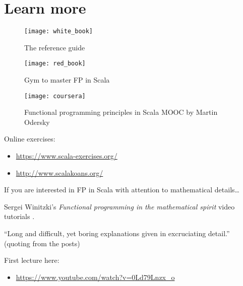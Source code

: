 \documentclass[10pt]{beamer}
\begin{document}
\section{Learn more}

\begin{frame}
\begin{figure}
\centering
\texttt{[image: white\_book]}
\caption{The reference guide}
\end{figure}
\end{frame}

\begin{frame}
\begin{figure}
\centering
\texttt{[image: red\_book]}
\caption{Gym to master FP in Scala}
\end{figure}
\end{frame}

\begin{frame}
\begin{figure}
\centering
\texttt{[image: coursera]}
\caption{Functional programming principles in Scala MOOC by Martin Odersky}
\end{figure}
\end{frame}

\begin{frame}
Online exercises:
\begin{itemize}
\item \url{https://www.scala-exercises.org/}
\item \url{http://www.scalakoans.org/}
\end{itemize}
\end{frame}

\begin{frame}[fragile]
If you are interested in FP in Scala with attention to mathematical details\ldots 


Sergei Winitzki's 
\emph{Functional programming in the mathematical spirit} video tutorials .

``Long and difficult, yet boring explanations given in excruciating detail.'' (quoting from the posts)  

First lecture here:
\begin{itemize}
\item 
\url{https://www.youtube.com/watch?v=0Ld79Lnzx_o}
\end{itemize}
\end{frame}


% 
% 
\end{document}
